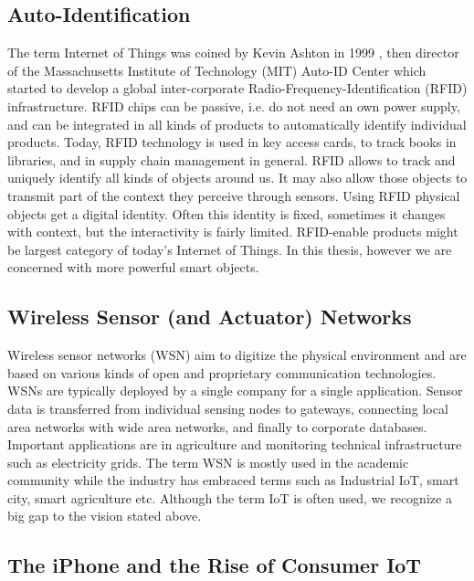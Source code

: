 \subsection{Auto-Identification}

The term Internet of Things was coined by Kevin Ashton in 1999 \parencite[c.f ][]{ashton2009internet}, then director of the Massachusetts Institute of Technology (MIT) Auto-ID Center which started to develop a global inter-corporate Radio-Frequency-Identification (RFID) infrastructure. RFID chips can be passive, i.e. do not need an own power supply, and can be integrated in all kinds of products to automatically identify individual products. Today, RFID technology is used in key access cards, to track books in libraries, and in supply chain management in general. RFID allows to track and uniquely identify all kinds of objects around us. It may also allow those objects to transmit part of the context they perceive through sensors. Using RFID physical objects get a digital identity. Often this identity is fixed, sometimes it changes with context, but the interactivity is fairly limited. RFID-enable products might be largest category of today's Internet of Things. In this thesis, however we are concerned with more powerful smart objects.  

\subsection{Wireless Sensor (and Actuator) Networks}

Wireless sensor networks (WSN) aim to digitize the physical environment and are based on various kinds of open and proprietary communication technologies. WSNs are typically deployed by a single company for a single application. Sensor data is transferred from individual sensing nodes to gateways, connecting local area networks with wide area networks, and finally to corporate databases. Important applications are in agriculture and monitoring technical infrastructure such as electricity grids. The term WSN is mostly used in the academic community while the industry has embraced terms such as Industrial IoT, smart city, smart agriculture etc. Although the term IoT is often used, we recognize a big gap to the vision stated above.

\subsection{The iPhone and the Rise of Consumer IoT}

